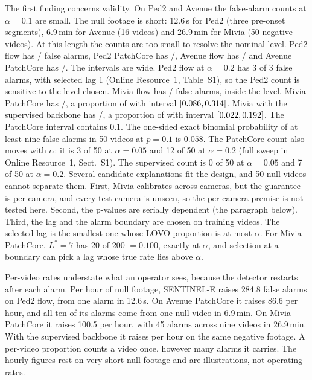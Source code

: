 The first finding concerns validity. On Ped2 and Avenue the false-alarm counts at
$\alpha=0.1$ are small. The null footage is short: 12.6\,s for Ped2 (three pre-onset
segments), 6.9\,min for Avenue (16 videos) and 26.9\,min for Mivia (50 negative
videos). At this length the counts are too small to resolve the nominal level. Ped2 flow has \RThreePedTwoFlowFAk{}/\RThreePedTwoFlowFAn{} false
alarms, Ped2 PatchCore has \RThreePedTwoPCFAk{}/\RThreePedTwoPCFAn{}, Avenue
flow has \RThreeAvenueFlowFAk{}/\RThreeAvenueFlowFAn{} and Avenue PatchCore has
\RThreeAvenuePCFAk{}/\RThreeAvenuePCFAn{}. The intervals are wide. Ped2 flow at
$\alpha=0.2$ has 3 of 3 false alarms, with selected lag 1 (Online Resource~1, Table~S1),
so the Ped2 count is sensitive to the level chosen. Mivia flow has
\RThreeMiviaFlowFAk{}/\RThreeMiviaFlowFAn{} false alarms, inside the level.
Mivia PatchCore has \RThreeMiviaPCFAk{}/\RThreeMiviaPCFAn{}, a proportion of
\RThreeMiviaPCFAp{} with interval $[0.086{},0.314{}]$.
Mivia with the supervised backbone has \RThreeMiviaSupFAk{}/\RThreeMiviaSupFAn{}, a
proportion of \RThreeMiviaSupFAp{} with interval
$[0.022{},0.192{}]$. The PatchCore interval contains $0.1$.
The one-sided exact binomial probability of at least nine false alarms in 50 videos
at $p=0.1$ is $0.058$. The PatchCore count also moves with $\alpha$: it is 3 of 50
at $\alpha=0.05$ and 12 of 50 at $\alpha=0.2$ (full sweep in Online Resource~1,
Sect.~S1). The supervised count is 0 of 50 at $\alpha=0.05$ and 7 of 50 at
$\alpha=0.2$. Several candidate explanations fit the design, and 50 null videos
cannot separate them. First, Mivia calibrates across cameras, but the guarantee is
per camera, and every test camera is unseen, so the per-camera premise is not tested
here. Second, the p-values are serially dependent (the paragraph below). Third, the
lag and the alarm boundary are chosen on training videos. The selected lag is the
smallest one whose LOVO proportion is at most $\alpha$. For Mivia PatchCore,
$L^\ast=7$ has 20 of 200 $=0.100$, exactly at $\alpha$, and selection at a boundary
can pick a lag whose true rate lies above $\alpha$.

Per-video rates understate what an operator sees, because the detector restarts after
each alarm. Per hour of null footage, SENTINEL-E raises 284.8 false alarms on Ped2
flow, from one alarm in 12.6\,s. On Avenue PatchCore it raises 86.6 per hour, and all
ten of its alarms come from one null video in 6.9\,min. On Mivia PatchCore it raises
100.5 per hour, with 45 alarms across nine videos in 26.9\,min. With the supervised
backbone it raises \RThreeMiviaSupFAhrP{} per hour on the same negative footage. A
per-video proportion counts a video once, however many alarms it carries. The hourly
figures rest on very short null footage and are illustrations, not operating rates.

